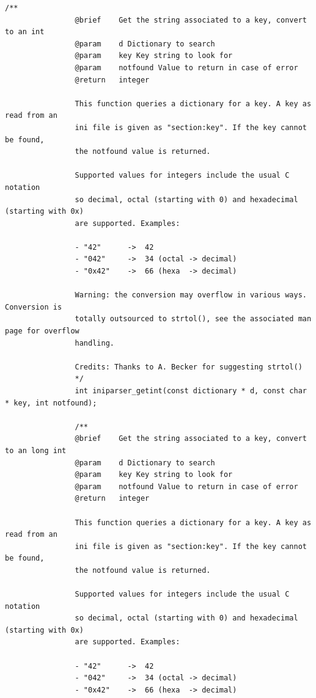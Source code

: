 \documentclass{article}
\begin{document}
\begin{Verbatim}[gobble=8]
                /**
                @brief    Get the string associated to a key, convert to an int
                @param    d Dictionary to search
                @param    key Key string to look for
                @param    notfound Value to return in case of error
                @return   integer
                
                This function queries a dictionary for a key. A key as read from an
                ini file is given as "section:key". If the key cannot be found,
                the notfound value is returned.
                
                Supported values for integers include the usual C notation
                so decimal, octal (starting with 0) and hexadecimal (starting with 0x)
                are supported. Examples:
                
                - "42"      ->  42
                - "042"     ->  34 (octal -> decimal)
                - "0x42"    ->  66 (hexa  -> decimal)
                
                Warning: the conversion may overflow in various ways. Conversion is
                totally outsourced to strtol(), see the associated man page for overflow
                handling.
                
                Credits: Thanks to A. Becker for suggesting strtol()
                */
                int iniparser_getint(const dictionary * d, const char * key, int notfound);
                
                /**
                @brief    Get the string associated to a key, convert to an long int
                @param    d Dictionary to search
                @param    key Key string to look for
                @param    notfound Value to return in case of error
                @return   integer
                
                This function queries a dictionary for a key. A key as read from an
                ini file is given as "section:key". If the key cannot be found,
                the notfound value is returned.
                
                Supported values for integers include the usual C notation
                so decimal, octal (starting with 0) and hexadecimal (starting with 0x)
                are supported. Examples:
                
                - "42"      ->  42
                - "042"     ->  34 (octal -> decimal)
                - "0x42"    ->  66 (hexa  -> decimal)
                

\end{Verbatim}
\end{document}
